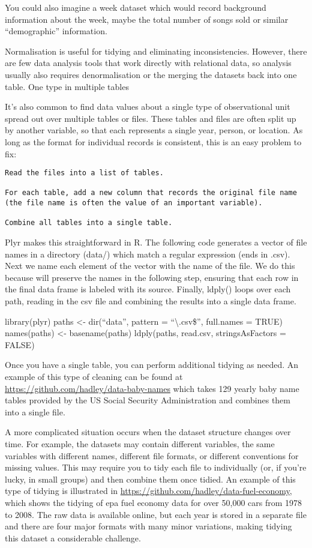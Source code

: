 \documentclass[]{article}
\begin{document}
You could also imagine a week dataset which would record background
information about the week, maybe the total number of songs sold or
similar ``demographic'' information.

Normalisation is useful for tidying and eliminating inconsistencies.
However, there are few data analysis tools that work directly with
relational data, so analysis usually also requires denormalisation or
the merging the datasets back into one table. One type in multiple
tables

It's also common to find data values about a single type of
observational unit spread out over multiple tables or files. These
tables and files are often split up by another variable, so that each
represents a single year, person, or location. As long as the format for
individual records is consistent, this is an easy problem to fix:

\begin{verbatim}
Read the files into a list of tables.

For each table, add a new column that records the original file name (the file name is often the value of an important variable).

Combine all tables into a single table.
\end{verbatim}

Plyr makes this straightforward in R. The following code generates a
vector of file names in a directory (data/) which match a regular
expression (ends in .csv). Next we name each element of the vector with
the name of the file. We do this because will preserve the names in the
following step, ensuring that each row in the final data frame is
labeled with its source. Finally, ldply() loops over each path, reading
in the csv file and combining the results into a single data frame.

library(plyr) paths \textless{}- dir(``data'', pattern =
``\textbackslash{}.csv\$'', full.names = TRUE) names(paths) \textless{}-
basename(paths) ldply(paths, read.csv, stringsAsFactors = FALSE)

Once you have a single table, you can perform additional tidying as
needed. An example of this type of cleaning can be found at
\url{https://github.com/hadley/data-baby-names} which takes 129 yearly
baby name tables provided by the US Social Security Administration and
combines them into a single file.

A more complicated situation occurs when the dataset structure changes
over time. For example, the datasets may contain different variables,
the same variables with different names, different file formats, or
different conventions for missing values. This may require you to tidy
each file to individually (or, if you're lucky, in small groups) and
then combine them once tidied. An example of this type of tidying is
illustrated in \url{https://github.com/hadley/data-fuel-economy}, which
shows the tidying of epa fuel economy data for over 50,000 cars from
1978 to 2008. The raw data is available online, but each year is stored
in a separate file and there are four major formats with many minor
variations, making tidying this dataset a considerable challenge.
\end{document}
